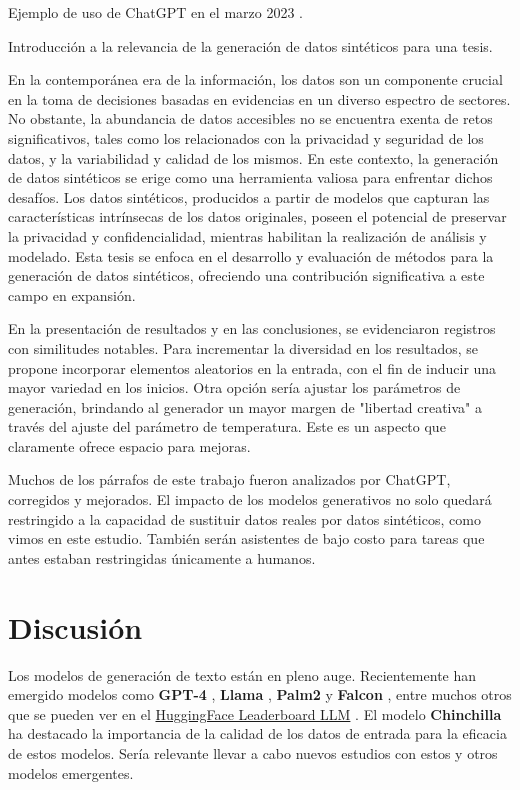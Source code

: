 Ejemplo de uso de ChatGPT en el marzo 2023 \cite{openai_chatgpt_2023}.
\begin{prompt}
    Introducción a la relevancia de la generación de datos sintéticos para una tesis.
\end{prompt}

\begin{chatGPT}
En la contemporánea era de la información, los datos son un componente crucial en la toma de decisiones basadas en evidencias en un diverso espectro de sectores. No obstante, la abundancia de datos accesibles no se encuentra exenta de retos significativos, tales como los relacionados con la privacidad y seguridad de los datos, y la variabilidad y calidad de los mismos. En este contexto, la generación de datos sintéticos se erige como una herramienta valiosa para enfrentar dichos desafíos. Los datos sintéticos, producidos a partir de modelos que capturan las características intrínsecas de los datos originales, poseen el potencial de preservar la privacidad y confidencialidad, mientras habilitan la realización de análisis y modelado. Esta tesis se enfoca en el desarrollo y evaluación de métodos para la generación de datos sintéticos, ofreciendo una contribución significativa a este campo en expansión.
\end{chatGPT}

En la presentación de resultados y en las conclusiones, se evidenciaron registros con similitudes notables. Para incrementar la diversidad en los resultados, se propone incorporar elementos aleatorios en la entrada, con el fin de inducir una mayor variedad en los inicios. Otra opción sería ajustar los parámetros de generación, brindando al generador un mayor margen de "libertad creativa" a través del ajuste del parámetro de temperatura. Este es un aspecto que claramente ofrece espacio para mejoras.

Muchos de los párrafos de este trabajo fueron analizados por ChatGPT, corregidos y mejorados. El impacto de los modelos generativos no solo quedará restringido a la capacidad de sustituir datos reales por datos sintéticos, como vimos en este estudio. También serán asistentes de bajo costo para tareas que antes estaban restringidas únicamente a humanos.


\section{Discusión}
Los modelos de generación de texto están en pleno auge. Recientemente han emergido modelos como \textbf{GPT-4} \cite{openai_gpt-4_2023}, \textbf{Llama} \cite{noauthor_llama_nodate}, \textbf{Palm2} \cite{anil_palm_2023} y \textbf{Falcon} \cite{noauthor_falcon_nodate}, entre muchos otros que se pueden ver en el \href{https://huggingface.co/spaces/HuggingFaceH4/open_llm_leaderboard}{HuggingFace Leaderboard LLM} \cite{noauthor_open_nodate}. El modelo \textbf{Chinchilla} \cite{hoffmann_training_2022} ha destacado la importancia de la calidad de los datos de entrada para la eficacia de estos modelos. Sería relevante llevar a cabo nuevos estudios con estos y otros modelos emergentes.

